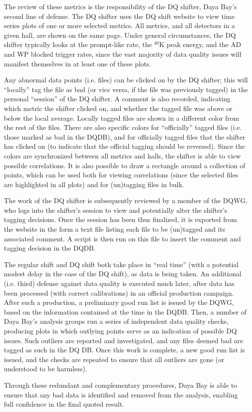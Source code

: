 \documentclass[../thesis.tex]{subfiles}
\begin{document}
The review of these metrics is the responsibility of the DQ shifter, Daya Bay's
second line of defense. The DQ shifter uses the DQ shift website to view time
series plots of one or more selected metrics. All metrics, and all detectors in
a given hall, are shown on the same page. Under general circumstances, the DQ
shifter typically looks at the prompt-like rate, the $^{40}$K peak energy, and
the AD and WP blocked trigger rates, since the vast majority of data quality
issues will manifest themselves in at least one of these plots.

Any abnormal data points (i.e. files) can be clicked on by the DQ shifter; this
will ``locally'' tag the file as bad (or vice versa, if the file was previously
tagged) in the personal ``session'' of the DQ shifter. A comment is also
recorded, indicating which metric the shifter clicked on, and whether the tagged
file was above or below the local average. Locally tagged files are shown in a
different color from the rest of the files. There are also specific colors for
``officially'' tagged files (i.e. those marked as bad in the DQDB), and for
officially tagged files that the shifter has clicked on (to indicate that the
official tagging should be reversed). Since the colors are synchronized between
all metrics and halls, the shifter is able to view possible correlations. It is
also possible to draw a rectangle around a collection of points, which can be
used both for viewing correlations (since the selected files are highlighted in
all plots) and for (un)tagging files in bulk.

The work of the DQ shifter is subsequently reviewed by a member of the DQWG, who
logs into the shifter's session to view and potentially alter the shifter's
tagging decisions. Once the session has been thus finalized, it is exported from
the website in the form a text file listing each file to be (un)tagged and its
associated comment. A script is then run on this file to insert the comment and
tagging decision in the DQDB.

The regular shift and DQ shift both take place in ``real time'' (with a
potential modest delay in the case of the DQ shift), as data is being taken. An
additional (i.e. third) defense against data quality is executed much later,
after data has been processed (with correct calibrations) in an official
production campaign. After such a production, a preliminary good run list is
issued by the DQWG, based on the information contained at the time in the
DQDB. Then, a number of Daya Bay's analysis groups run a series of independent
data quality checks, producing plots in which outlying points serve as an
indication of possible DQ issues. Such outliers are reported and investigated,
and any files deemed bad are tagged as such in the DQ DB. Once this work is
complete, a new good run list is issued, and the checks are repeated to ensure
that all outliers are gone (or understood to be harmless).

Through these redundant and complementary procedures, Daya Bay is able to ensure
that any bad data is identified and removed from the analysis, enabling full
confidence in the final quoted result.
\end{document}
